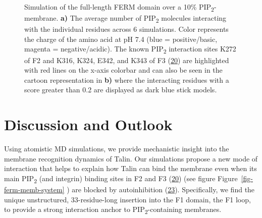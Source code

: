 \documentclass[
  twocolumn]{biophys-new-mod}
\begin{document}
\begin{figure}
\begin{minipage}[t]{\linewidth}
{}

\subcaption{\label{fig-ferm-memb-system}~}
\end{minipage}%

\caption{\label{fig-ferm-further}Simulation of the full-length FERM
domain over a 10\% PIP\textsubscript{2}-membrane. \textbf{a)} The
average number of PIP\textsubscript{2} molecules interacting with the
individual residues across 6 simulations. Color represents the charge of
the amino acid at pH 7.4 (blue = positive/basic, magenta =
negative/acidic). The known PIP\textsubscript{2} interaction sites K272
of F2 and K316, K324, E342, and K343 of F3
(\protect\hyperlink{ref-chinthalapudiInteractionTalinCell2018a}{20}) are
highlighted with red lines on the x-axis colorbar and can also be seen
in the cartoon representation in \textbf{b)} where the interacting
residues with a score greater than 0.2 are displayed as dark blue stick
models.}

\end{figure}

\hypertarget{discussion-and-outlook}{%
\section{Discussion and Outlook}\label{discussion-and-outlook}}

Using atomistic MD simulations, we provide mechanistic insight into the
membrane recognition dynamics of Talin. Our simulations propose a new
mode of interaction that helps to explain how Talin can bind the
membrane even when its main PIP\textsubscript{2} (and integrin) binding
sites in F2 and F3
(\protect\hyperlink{ref-chinthalapudiInteractionTalinCell2018a}{20})
(see figure Figure~\ref{fig-ferm-memb-system} ) are blocked by
autoinhibition
(\protect\hyperlink{ref-deddenArchitectureTalin1Reveals2019a}{23}).
Specifically, we find the unique unstructured, 33-residue-long insertion
into the F1 domain, the F1 loop, to provide a strong interaction anchor
to PIP\textsubscript{2}-containing membranes.
\end{document}
